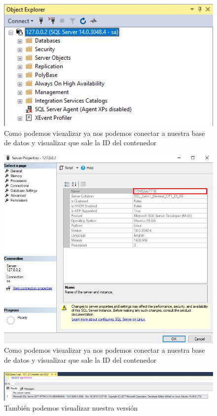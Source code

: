 \documentclass[preprint,12pt]{elsarticle}
\begin{document}
\begin{figure}[H]
	\begin{center}
		\includegraphics[width=12cm]{./IMAGENES/foto14} 
		\caption{Como podemos visualizar ya nos podemos conectar a nuestra base de datos y visualizar que sale la ID del contenedor}
	\end{center}
\end{figure}

\begin{figure}[H]
	\begin{center}
		\includegraphics[width=12cm]{./IMAGENES/foto15} 
		\caption{Como podemos visualizar ya nos podemos conectar a nuestra base de datos y visualizar que sale la ID del contenedor}
	\end{center}
\end{figure}

\begin{figure}[H]
	\begin{center}
		\includegraphics[width=12cm]{./IMAGENES/foto16} 
		\caption{También podemos visualizar nuestra versión}
	\end{center}
\end{figure}
\end{document}
